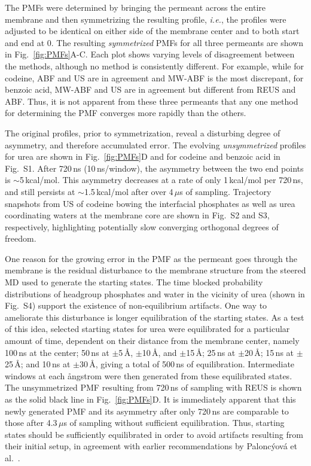 \par The PMFs were determined by bringing the permeant across the entire membrane and then symmetrizing the resulting profile, {\it i.e.}, the profiles were adjusted to be identical on either side of the membrane center and to both start and end at 0.  The resulting {\it symmetrized} PMFs for all three permeants are shown in Fig.~\ref{fig:PMFs}A-C.  Each plot shows varying levels of disagreement between the methods, although no method is consistently different.  For example, while for codeine, ABF and US are in agreement and MW-ABF is the most discrepant, for benzoic acid, MW-ABF and US are in agreement but different from REUS and ABF.  Thus, it is not apparent from these three permeants that any one method for determining the PMF converges more rapidly than the others.

\par The original profiles, prior to symmetrization, reveal a disturbing degree of asymmetry, and therefore accumulated error.  The evolving {\it unsymmetrized} profiles for urea are shown in Fig.~\ref{fig:PMFs}D and for codeine and benzoic acid in Fig.~S1.  After 720\,ns (10\,ns/window), the asymmetry between the two end points is $\sim$5\,kcal/mol.  This asymmetry decreases at a rate of only 1\,kcal/mol per 720\,ns, and still persists at $\sim$1.5\,kcal/mol after over 4\,$\mu$s of sampling. Trajectory snapshots from US of codeine bowing the interfacial phosphates as well as urea coordinating waters at the membrane core are shown in Fig.~S2 and S3, respectively, highlighting potentially slow converging orthogonal degrees of freedom.

\par One reason for the growing error in the PMF as the permeant goes through the membrane is the residual disturbance to the membrane structure from the steered MD used to generate the starting states. The time blocked probability distributions of headgroup phosphates and water in the vicinity of urea (shown in Fig.~S4) support the existence of non-equilibrium artifacts. One way to ameliorate this disturbance is longer equilibration of the starting states.  As a test of this idea, selected starting states for urea were equilibrated for a particular amount of time, dependent on their distance from the membrane center, namely 100\,ns at the center; 50\,ns at
$\pm$5\,\AA, $\pm$10\,\AA, and $\pm$15\,\AA; 25\,ns at $\pm$20\,\AA; 15\,ns at $\pm$25\,\AA; and 10\,ns at $\pm$30\,\AA,
giving a total of 500\,ns of equilibration.  Intermediate windows at each \aa ngstrom were then generated from these equilibrated states.  The unsymmetrized PMF resulting from 720\,ns of sampling with REUS is shown as the solid black line in Fig.~\ref{fig:PMFs}D.  It is immediately apparent that this newly generated PMF and its asymmetry after only 720\,ns are comparable to those after 4.3\,$\mu$s of sampling without sufficient equilibration.
Thus,
starting states should be sufficiently equilibrated in order to avoid artifacts resulting from their initial setup, in agreement with earlier recommendations by Palonc{\'{y}}ov{\'{a}} et al.~\cite{Paloncyova2012}.


